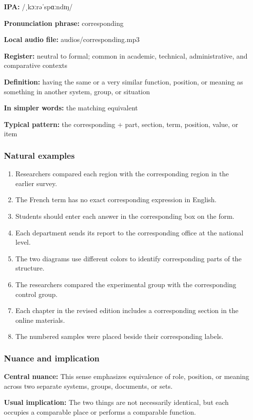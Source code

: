 \documentclass[11pt]{article}
\begin{document}
\textbf{IPA:} /ˌkɔːrəˈspɑːndɪŋ/

\textbf{Pronunciation phrase:} corresponding

\textbf{Local audio file:} audios/corresponding.mp3

\textbf{Register:} neutral to formal; common in academic, technical, administrative, and comparative contexts

\textbf{Definition:} having the same or a very similar function, position, or meaning as something in another system, group, or situation

\textbf{In simpler words:} the matching equivalent

\textbf{Typical pattern:} the corresponding + part, section, term, position, value, or item

\subsubsection{Natural examples}
\begin{enumerate}
  \item Researchers compared each region with the corresponding region in the earlier survey.
  \item The French term has no exact corresponding expression in English.
  \item Students should enter each answer in the corresponding box on the form.
  \item Each department sends its report to the corresponding office at the national level.
  \item The two diagrams use different colors to identify corresponding parts of the structure.
  \item The researchers compared the experimental group with the corresponding control group.
  \item Each chapter in the revised edition includes a corresponding section in the online materials.
  \item The numbered samples were placed beside their corresponding labels.
\end{enumerate}

\subsubsection{Nuance and implication}
\textbf{Central nuance:} This sense emphasizes equivalence of role, position, or meaning across two separate systems, groups, documents, or sets.

\textbf{Usual implication:} The two things are not necessarily identical, but each occupies a comparable place or performs a comparable function.
\end{document}
